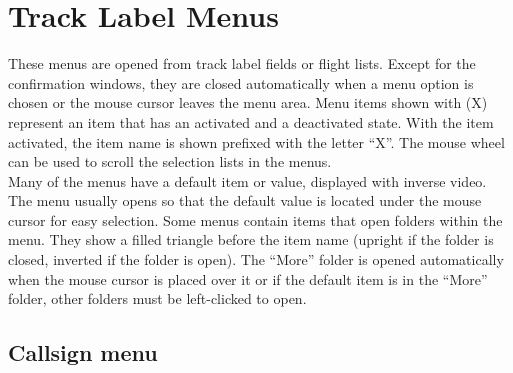 \documentclass[11pt,a4paper,oldfontcommands]{memoir}
\begin{document}
\section{Track Label Menus}
These menus are opened from track label fields or flight lists. Except for the confirmation windows, they
are closed automatically when a menu option is chosen or the mouse cursor leaves the menu area. Menu
items shown with (X) represent an item that has an activated and a deactivated state. With the item
activated, the item name is shown prefixed with the letter “X”. The mouse wheel can be used to scroll the
selection lists in the menus.\\

Many of the menus have a default item or value, displayed with inverse video. The menu usually opens so
that the default value is located under the mouse cursor for easy selection. Some menus contain items that
open folders within the menu. They show a filled triangle before the item name (upright if the folder is
closed, inverted if the folder is open). The “More” folder is opened automatically when the mouse cursor is
placed over it or if the default item is in the “More” folder, other folders must be left-clicked to open.\\

\subsection{Callsign menu}
\label{menu:cs}
\end{document}
